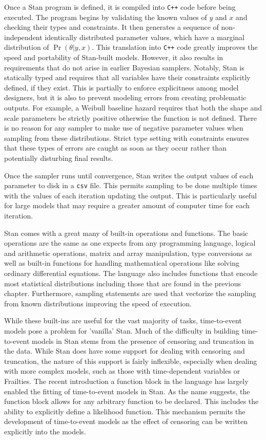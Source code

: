 Once a Stan program is defined, it is compiled into \lstinline{C++} code before being executed. The program begins by validating the known values of $y$ and $x$ and checking their types and constraints. It then generates a sequence of non-independent identically distributed parameter values, which have a marginal distribution of $\Pr(\theta|y,x)$. This translation into \lstinline{C++} code greatly improves the speed and portability of Stan-built models. However, it also results in requirements that do not arise in earlier Bayesian samplers. Notably, Stan is statically typed and requires that all variables have their constraints explicitly defined, if they exist. This is partially to enforce explicitness among model designers, but it is also to prevent modeling errors from creating problematic outputs. For example, a Weibull baseline hazard requires that both the shape and scale parameters be strictly positive otherwise the function is not defined. There is no reason for any sampler to make use of negative parameter values when sampling from these distributions. Strict type setting with constraints ensures that these types of errors are caught as soon as they occur rather than potentially disturbing final results. 

Once the sampler runs until convergence, Stan writes the output values of each parameter to disk in a \lstinline{csv} file. This permits sampling to be done multiple times with the values of each iteration updating the output. This is particularly useful for large models that may require a greater amount of computer time for each iteration.

Stan comes with a great many of built-in operations and functions. The basic operations are the same as one expects from any programming language, logical and arithmetic operations, matrix and array manipulation, type conversions as well as built-in functions for handling mathematical operations like solving ordinary differential equations. The language also includes functions that encode most statistical distributions including those that are found in the previous chapter. Furthermore, sampling statements are used that vectorize the sampling from known distributions improving the speed of execution. 

While these built-ins are useful for the vast majority of tasks, time-to-event models pose a problem for 'vanilla' Stan. Much of the difficulty in building time-to-event models in Stan stems from the presence of censoring and truncation in the data. While Stan does have some support for dealing with censoring and truncation, the nature of this support is fairly inflexible, especially when dealing with more complex models, such as those with time-dependent variables or Frailties. The recent introduction a function block in the language has largely enabled the fitting of time-to-event models in Stan. As the name suggests, the function block allows for any arbitrary function to be declared. This includes the ability to explicitly define a likelihood function. This mechanism permits the development of time-to-event models as the effect of censoring can be written explicitly into the models. 


